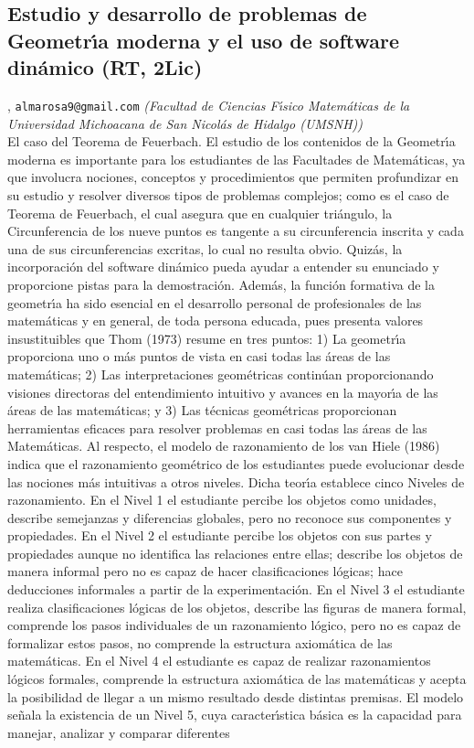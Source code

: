 \subsection{\sffamily Estudio y desarrollo de problemas de Geometr\'\i a moderna y el uso de software din\'amico {\footnotesize (RT, 2Lic)}} \label{reg-522} 
, {\tt almarosa9@gmail.com}  {\slshape (Facultad de Ciencias F\'\i sico Matem\'aticas  de la Universidad Michoacana de San Nicol\'as de Hidalgo (UMSNH))}\\
          \noindent El caso del Teorema de Feuerbach. El estudio de los contenidos de la Geometr\'\i a moderna es importante para los estudiantes de las Facultades de Matem\'aticas, ya que involucra nociones, conceptos y procedimientos que permiten profundizar en su estudio y resolver diversos tipos de problemas complejos; como es el caso de Teorema de Feuerbach, el cual asegura que en cualquier tri\'angulo, la Circunferencia de los nueve puntos es tangente a su circunferencia inscrita y cada una de sus circunferencias excritas, lo cual no resulta obvio. Quiz\'as, la incorporaci\'on del software din\'amico pueda ayudar a entender su enunciado y proporcione pistas para la demostraci\'on. Adem\'as, la funci\'on formativa de la geometr\'\i a ha sido esencial en el desarrollo personal de profesionales de las matem\'aticas y en general, de toda persona educada, pues presenta valores insustituibles que Thom (1973) resume en tres puntos: 1) La geometr\'\i a proporciona uno o m\'as puntos de vista en casi todas las \'areas de las matem\'aticas; 2) Las interpretaciones geom\'etricas contin\'uan proporcionando visiones directoras del entendimiento intuitivo y avances en la mayor\'\i a de las \'areas de las matem\'aticas; y 3) Las t\'ecnicas geom\'etricas proporcionan herramientas eficaces para resolver problemas en casi todas las \'areas de las Matem\'aticas. Al respecto, el modelo de razonamiento de los van Hiele (1986) indica que el razonamiento geom\'etrico de los estudiantes puede evolucionar desde las nociones m\'as intuitivas a otros niveles. Dicha teor\'\i a establece cinco Niveles de razonamiento. En el Nivel 1 el estudiante percibe los objetos como unidades, describe semejanzas y diferencias globales, pero no reconoce sus componentes y propiedades. En el Nivel 2 el estudiante percibe los objetos con sus partes y propiedades aunque no identifica las relaciones entre ellas; describe los objetos de manera informal pero no es capaz de hacer clasificaciones l\'ogicas; hace deducciones informales a partir de la experimentaci\'on. En el Nivel 3 el estudiante realiza clasificaciones l\'ogicas de los objetos, describe las figuras de manera formal, comprende los pasos individuales de un razonamiento l\'ogico, pero no es capaz de formalizar estos pasos, no comprende la estructura axiom\'atica de las matem\'aticas. En el Nivel 4 el estudiante es capaz de realizar razonamientos l\'ogicos formales, comprende la estructura axiom\'atica de las matem\'aticas y acepta la posibilidad de llegar a un mismo resultado desde distintas premisas. El modelo se\~nala la existencia de un Nivel 5, cuya caracter\'\i stica b\'asica es la capacidad para manejar, analizar y comparar diferentes 
